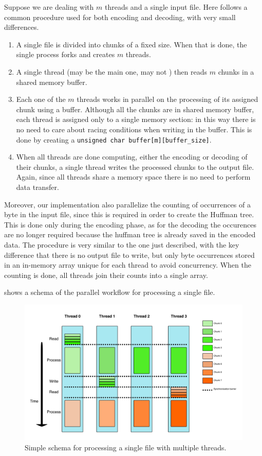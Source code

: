 Suppose we are dealing with \(m\) threads and a single input file. Here follows a common procedure used for both encoding and decoding, with very small differences. 
\begin{enumerate}
	\item A single file is divided into chunks of a fixed size. When that is done, the single process forks and creates \(m\) threads.
	\item A single thread (may be the main one, may not ) then reads \(m\) chunks in a shared memory buffer.
	\item Each one of the \(m\) threads works in parallel on the processing of its assigned chunk using a buffer. Although all the chunks are in shared memory buffer, each thread is assigned only to a single memory section: in this way there is no need to care about racing conditions when writing in the buffer. This is done by creating a \verb|unsigned char buffer[m][buffer_size]|. 
	\item When all threads are done computing, either the encoding or decoding of their chunks, a single thread writes the processed chunks to the output file.
	Again, since all threads share a memory space there is no need to perform data transfer.
\end{enumerate}

Moreover, our implementation also parallelize the counting of occurrences of a byte in the input file, since this is required in order to create the Huffman tree. 
This is done only during the encoding phase, as for the decoding the occurences are no longer required because the huffman tree is already saved in the encoded data. The procedure is very similar to the one just described, with the key difference that there is no output file to write, but only byte occurrences stored in an in-memory array unique for each thread to avoid concurrency. When the counting is done, all threads join their counts into a single array.

  shows a schema of the parallel workflow for processing a single file. 

\begin{figure}
	\centering
	\includegraphics[width=0.8\linewidth]{../imgs/threading}
	\caption{Simple schema for processing a single file with multiple threads.}
	\label{fig:threading}
\end{figure}


